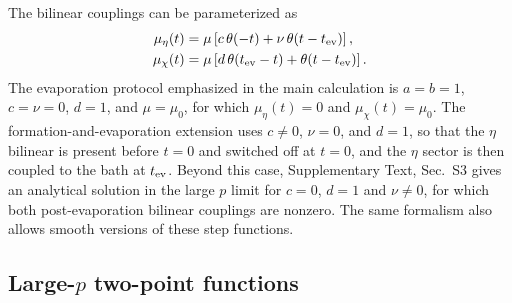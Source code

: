 \documentclass[pdflatex,sn-nature]{sn-jnl}
\begin{document}
The bilinear couplings can be parameterized as
\begin{equation}
\begin{aligned}
\mu_\eta(t)
&=
\mu\left[
c\,\theta(-t)+\nu\,\theta(t-t_{\rm ev})
\right],
\\
\mu_\chi(t)
&=
\mu\left[
d\,\theta(t_{\rm ev}-t)+\theta(t-t_{\rm ev})
\right].
\end{aligned}
\label{eq:methods-bilinear-protocol}
\end{equation}
The evaporation protocol emphasized in the main calculation is \(a=b=1\), \(c=\nu=0\), \(d=1\), and \(\mu=\mu_0\), for which \(\mu_\eta(t)=0\) and \(\mu_\chi(t)=\mu_0\). The formation-and-evaporation extension uses \(c\neq0\), \(\nu=0\), and \(d=1\), so that the \(\eta\) bilinear is present before \(t=0\) and switched off at \(t=0\), and the \(\eta\) sector is then coupled to the bath at \(t_{\rm ev}\). Beyond this case, Supplementary Text, Sec.~S3 gives an analytical solution in the large $p$ limit for \(c=0\), \(d=1\) and \(\nu\neq0\), for which both
post-evaporation bilinear couplings are nonzero. The same formalism also allows smooth versions of these step functions.

\subsection{Large-\texorpdfstring{\(p\)}{p} two-point functions}
\label{sec:methods-large-p}
\end{document}
